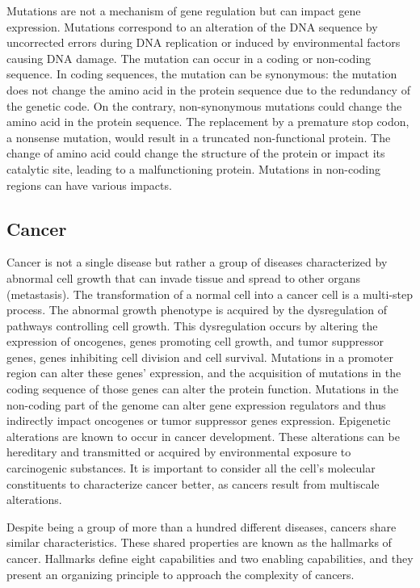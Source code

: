 \documentclass[../main.tex]{subfiles}
\begin{document}
		Mutations are not a mechanism of gene regulation but can impact gene expression.
		Mutations correspond to an alteration of the DNA sequence by uncorrected errors during DNA replication or induced by environmental factors causing DNA damage.
		The mutation can occur in a coding or non-coding sequence.
		In coding sequences, the mutation can be synonymous: the mutation does not change the amino acid in the protein sequence due to the redundancy of the genetic code.
		On the contrary, non-synonymous mutations could change the amino acid in the protein sequence.
		The replacement by a premature stop codon, a nonsense mutation, would result in a truncated non-functional protein.
		The change of amino acid could change the structure of the protein or impact its catalytic site, leading to a malfunctioning protein.
		Mutations in non-coding regions can have various impacts.

	\subsection{Cancer}
		Cancer is not a single disease but rather a group of diseases characterized by abnormal cell growth that can invade tissue and spread to other organs (metastasis).
		The transformation of a normal cell into a cancer cell is a multi-step process.
		The abnormal growth phenotype is acquired by the dysregulation of pathways controlling cell growth.
		This dysregulation occurs by altering the expression of oncogenes, genes promoting cell growth, and tumor suppressor genes, genes inhibiting cell division and cell survival.
		Mutations in a promoter region can alter these genes' expression, and the acquisition of mutations in the coding sequence of those genes can alter the protein function.
		Mutations in the non-coding part of the genome can alter gene expression regulators and thus indirectly impact oncogenes or tumor suppressor genes expression.
		Epigenetic alterations are known to occur in cancer development.
		These alterations can be hereditary and transmitted or acquired by environmental exposure to carcinogenic substances.
		It is important to consider all the cell's molecular constituents to characterize cancer better, as cancers result from multiscale alterations.

		Despite being a group of more than a hundred different diseases, cancers share similar characteristics.
		These shared properties are known as the hallmarks of cancer.
		Hallmarks define eight capabilities and two enabling capabilities, and they present an organizing principle to approach the complexity of cancers.
\end{document}
